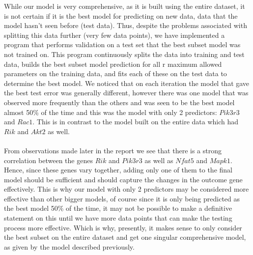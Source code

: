 \documentclass{article}
\begin{document}
While our model is very comprehensive, as it is built using the entire dataset, it is not certain if it is the best model for predicting on new data, data that the model hasn't seen before (test data).
Thus, despite the problems associated with splitting this data further (very few data points), we have implemented a program that performs validation on a test set that the best subset model was not trained on. This program continuously splits the data into training and test data, builds the best subset model prediction for all r maximum allowed parameters on the training data, and fits each of these on the test data to determine the best model. We noticed that on each iteration the model that gave the best test error was generally different, however there was one model that was observed more frequently than the others and was seen to be the best model almost 50\% of the time and this was the model with only 2 predictors: $Pik3r3$ and $Rac1$. This is in contrast to the model built on the entire data which had $Rik$ and $Akt2$ as well.\\
\null\\
From observations made later in the report we see that there is a strong correlation between the genes $Rik$ and $Pik3r3$ as well as $Nfat5$ and $Mapk1$. Hence, since these genes vary together, adding only one of them to the final model should be sufficient and should capture the changes in the outcome gene effectively. This is why our model with only 2 predictors may be considered more effective than other bigger models, of course since it is only being predicted as the best model 50\% of the time, it may not be possible to make a definitive statement on this until we have more data points that can make the testing process more effective. Which is why, presently, it makes sense to only consider the best subset on the entire dataset and get one singular comprehensive model, as given by the model described previously.

%
\end{document}
